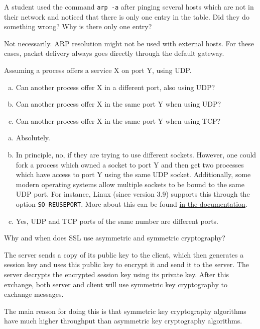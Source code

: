 \begin{Exercise}
A student used the command \texttt{arp -a} after pinging several hosts which are not in their network and noticed that there is only one entry in the table.
Did they do something wrong? Why is there only one entry?
\end{Exercise}
\begin{Answer}
Not necessarily. ARP resolution might not be used with external hosts.
For these cases, packet delivery always goes directly through the default gateway.
\end{Answer}

\begin{Exercise}
Assuming a process offers a service X on port Y, using UDP.
\begin{enumerate}[a)]
\item Can another process offer X in a different port, also using UDP?
\item Can another process offer X in the same port Y when using UDP?
\item Can another process offer X in the same port Y when using TCP?
\end{enumerate}
\end{Exercise}
\begin{Answer}
\begin{enumerate}[a)]
\item Absolutely.
\item In principle, no, if they are trying to use different sockets.
However, one could fork a process which owned a socket to port Y and then get two processes which have access to port Y using the same UDP socket.
Additionally, some modern operating systems allow multiple sockets to be bound to the same UDP port. For instance, Linux (since version 3.9) supports this through the option \texttt{SO\_REUSEPORT}. More about this can be found \href{http://man7.org/linux/man-pages/man7/socket.7.html}{in the documentation}.
\item Yes, UDP and TCP ports of the same number are different ports.
\end{enumerate}
\end{Answer}

\begin{Exercise}
Why and when does SSL use asymmetric and symmetric cryptography?
\end{Exercise}
\begin{Answer}
The server sends a copy of its public key to the client, which then generates a session key and uses this public key to encrypt it and send it to the server.
The server decrypts the encrypted session key using its private key.
After this exchange, both server and client will use symmetric key cryptography to exchange messages.

The main reason for doing this is that symmetric key cryptography algorithms have much higher throughput than asymmetric key cryptography algorithms.
\end{Answer}

